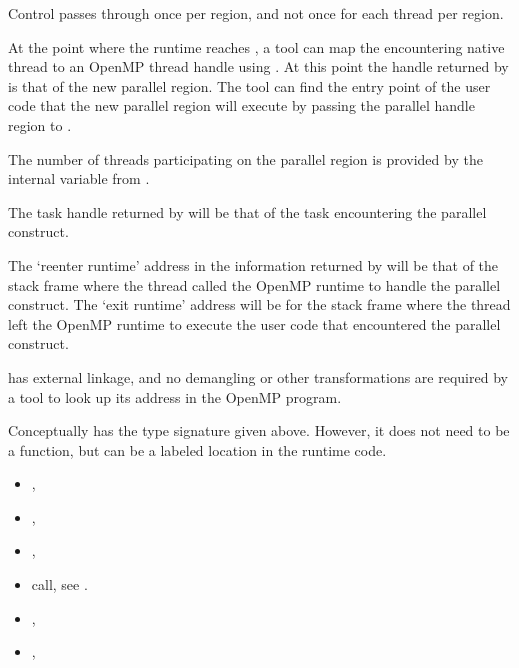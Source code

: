 Control passes through 
once per region, and not once for each thread per region.

At the point where the runtime reaches ,
a tool can map the encountering native thread to an OpenMP
thread handle using
.
At this point the handle returned by 
is that of the new parallel region.
The tool can find the entry point of the user code that
the new parallel region will execute by passing the parallel handle region
to .

The number of threads participating on the parallel region is provided by
the internal variable  from .

The task handle returned by
will be that of the task encountering the parallel construct.

The `reenter runtime' address in the information returned by
will be that of the stack frame where the thread called the OpenMP
runtime to handle the parallel construct.
The `exit runtime' address will be for the stack frame where the thread
left the OpenMP runtime to execute the user code that encountered
the parallel construct.

\restrictions

 has external  linkage, and no
demangling or other transformations are required by a tool
to look up its address in the OpenMP program.

Conceptually  has the type signature
given above.
However, it does not need to be a function, but can be a labeled location
in the runtime code.

\crossreferences

\begin{itemize}
\item
  , 
\item
  , 
\item
  , 
\item {} call, see 
  .
\item
  , 
\item
  , 
\end{itemize}

